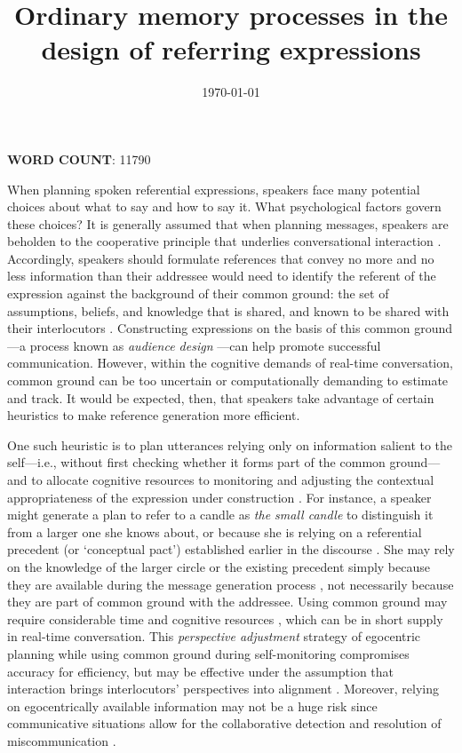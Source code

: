 \documentclass[natbib,man,a4paper]{apa6}
\date{\today}
\title{Ordinary memory processes in the design of referring expressions}
\begin{document}
\maketitle
\begin{center}
\textbf{WORD COUNT}: 11790
\end{center}

When planning spoken referential expressions, speakers face many potential choices about what to say and how to say it. What psychological factors govern these choices? It is generally assumed that when planning messages, speakers are beholden to the cooperative principle that underlies conversational interaction \citep{grice75}. Accordingly, speakers should formulate references that convey no more and no less information than their addressee would need to identify the referent of the expression against the background of their common ground: the set of assumptions, beliefs, and knowledge that is shared, and known to be shared with their interlocutors \citep{clarkmarshall81}. Constructing expressions on the basis of this common ground---a process known as \emph{audience design} \citep{clarkmurphy82}---can help promote successful communication.  However, within the cognitive demands of real-time conversation, common ground can be too uncertain or computationally demanding to estimate and track.  It would be expected, then, that speakers take advantage of certain heuristics to make reference generation more efficient.

One such heuristic is to plan utterances relying only on information salient to the self---i.e., without first checking whether it forms part of the common ground---and to allocate cognitive resources to monitoring and adjusting the contextual appropriateness of the expression under construction \citep{hortonkeysar96}.  For instance, a speaker might generate a plan to refer to a candle as \emph{the small candle} to distinguish it from a larger one she knows about, or because she is relying on a referential precedent (or `conceptual pact') established earlier in the discourse \citep{brennanclark96}.  She may rely on the knowledge of the larger circle or the existing precedent simply because they are available during the message generation process \citep{DellBrown1991}, not necessarily because they are part of common ground with the addressee.  Using common ground may require considerable time and cognitive resources \citep{hortonkeysar96,rossnagel00}, which can be in short supply in real-time conversation. This \emph{perspective adjustment} strategy of egocentric planning while using common ground during self-monitoring \citep{hortonkeysar96} compromises accuracy for efficiency, but may be effective under the assumption that interaction brings interlocutors' perspectives into alignment \citep{pickeringgarrod04}. Moreover, relying on egocentrically available information may not be a huge risk since communicative situations allow for the collaborative detection and resolution of miscommunication \citep{fussellkrauss92}.  
\end{document}
